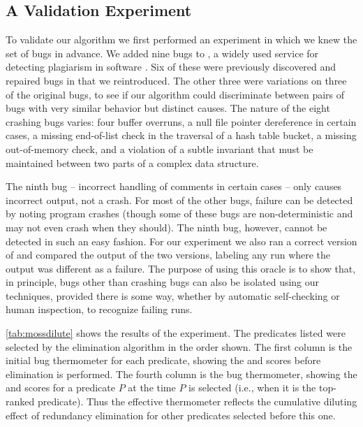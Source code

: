 \subsection{A Validation Experiment}

To validate our algorithm we first performed an experiment in which we
knew the set of bugs in advance.  We added nine bugs to \moss, a
widely used service for detecting plagiarism in software
\cite{Schleimer:2003:WLA}.  Six of these were previously discovered
and repaired bugs in \moss that we reintroduced.  The other three were
variations on three of the original bugs, to see if our algorithm could
discriminate between pairs of bugs with very similar behavior but
distinct causes.  The nature of the eight crashing bugs varies: four
buffer overruns, a null file pointer dereference in certain cases, a
missing end-of-list check in the traversal of a hash table bucket, a missing
out-of-memory check, and a violation of a subtle invariant that must be maintained between two
parts of a complex data structure.  

The ninth bug -- incorrect handling of comments in certain cases --
only causes incorrect output, not a crash.  For most of the other
bugs, failure can be detected by noting program crashes (though some
of these bugs are non-deterministic and may not even crash when they
should).  The ninth bug, however, cannot be detected in such an easy
fashion.  For our experiment we also ran a correct version of \moss{}
and compared the output of the two versions, labeling any run where
the output was different as a failure.  The purpose of using this
oracle is to show that, in principle, bugs other than crashing bugs
can also be isolated using our techniques, provided there is some way,
whether by automatic self-checking or human inspection, to recognize
failing runs.



\autoref{tab:mossdilute} shows the results of the experiment.  The
predicates listed were selected by the elimination algorithm in the
order shown.  The first column is the initial bug thermometer for each
predicate, showing the \context{} and \increase{} scores before
elimination is performed. The fourth column is the 
bug thermometer, showing the \context{} and \increase{} scores for a
predicate $P$ at the time $P$ is selected (i.e., when it is the
top-ranked predicate).  Thus the effective thermometer reflects the
cumulative diluting effect of redundancy elimination for other
predicates selected before this one.

